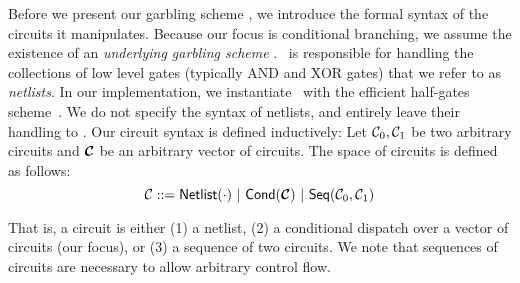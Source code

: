 Before we present our garbling scheme \ourschemelong, we introduce the
formal syntax of the circuits it manipulates.
Because our focus is conditional branching, we assume the existence of
an \emph{underlying garbling scheme} \underscheme.
\underscheme\ is responsible for handling the collections of low level
gates (typically AND and XOR gates) that we refer to as \emph{netlists}.
In our implementation, we instantiate \underscheme\ with the efficient
half-gates scheme~\cite{EC:ZahRosEva15}.
We do not specify the syntax of netlists, and entirely leave their
handling to \underscheme.
Our circuit syntax is defined inductively:
Let $\mathcal C_0, \mathcal C_1$ be two arbitrary circuits and $\vec \cir$ be an
arbitrary vector of circuits. The space of
circuits is defined as follows:
\[
  \cir ::= \netlist(\cdot)~|~%
  \conditional(\vec \cir)~|~%
  \sequential(\cir_0, \cir_1)
\]

That is, a circuit is either (1) a netlist, (2) a conditional dispatch
over a vector of circuits (our focus), or (3) a sequence of two
circuits.
We note that sequences of circuits are necessary to allow arbitrary
control flow.


